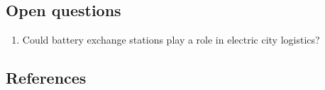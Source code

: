 \documentclass[
]{book}
\providecommand{\tightlist}{%
  \setlength{\itemsep}{0pt}\setlength{\parskip}{0pt}}
\begin{document}
\hypertarget{open-questions-27}{%
\subsection*{Open questions}\label{open-questions-27}}

\begin{enumerate}
\def\labelenumi{\arabic{enumi}.}
\tightlist
\item
  Could battery exchange stations play a role in electric city logistics?
\end{enumerate}

\hypertarget{references-27}{%
\subsection*{References}\label{references-27}}
\end{document}
